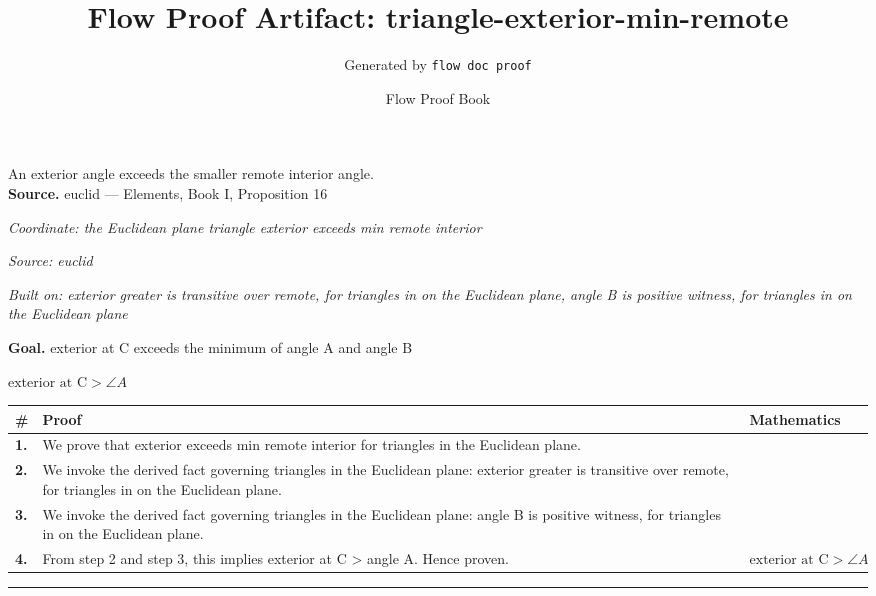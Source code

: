 \documentclass[11pt]{article}
\title{Flow Proof Artifact: triangle-exterior-min-remote}
\author{Generated by \texttt{flow doc proof}}
\date{Flow Proof Book}
\theoremstyle{definition}
\begin{document}
\maketitle
An exterior angle exceeds the smaller remote interior angle.\\[0.5em]
\textbf{Source.} euclid — Elements, Book I, Proposition 16\\[0.5em]
\bigskip
{}\par
\smallskip\noindent\textit{Coordinate: the Euclidean plane \cdot triangle \cdot exterior exceeds min remote interior}\par
\smallskip\noindent\textit{Source: euclid}\par
\smallskip\noindent\textit{Built on: exterior greater is transitive over remote, for triangles in on the Euclidean plane, angle B is positive witness, for triangles in on the Euclidean plane}\par
\medskip
\noindent\textbf{Goal.} exterior at C exceeds the minimum of angle A and angle B\par
\noindent$\displaystyle \text{exterior at C} > \angle A$\par
\medskip
\noindent
\begin{tabular}{@{} >{\raggedright\arraybackslash}p{} >{\raggedright\arraybackslash}p{} >{\raggedleft\arraybackslash}p{} @{}}
\textbf{\#} & \textbf{Proof} & \textbf{Mathematics} \\
\midrule
\textbf{1.} & We prove that exterior exceeds min remote interior for triangles in the Euclidean plane. & \\[0.45em]
\textbf{2.} & We invoke the derived fact governing triangles in the Euclidean plane: exterior greater is transitive over remote, for triangles in on the Euclidean plane. & \\[0.45em]
\textbf{3.} & We invoke the derived fact governing triangles in the Euclidean plane: angle B is positive witness, for triangles in on the Euclidean plane. & \\[0.45em]
\textbf{4.} & From step 2 and step 3, this implies exterior at C > angle A. Hence proven. & $\displaystyle \text{exterior at C} > \angle A$ \\[0.45em]
\bottomrule
\end{tabular}
\label{thm:Geometry-triangle-exterior_exceeds_min_remote_interior}
\par\medskip\hrule
\end{document}
